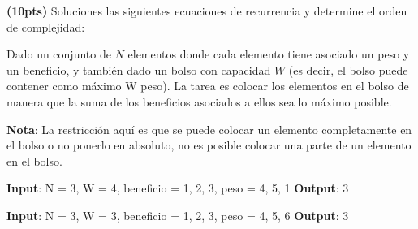 \documentclass[12pt, a4paper]{exam}
\begin{document}
\begin{questions}
	\pointsdroppedatright
         \question \textbf{(10pts)} Soluciones las siguientes ecuaciones de recurrencia y 
         determine el orden de complejidad:
	\question 

    Dado un conjunto de $N$ elementos donde cada elemento tiene asociado un peso y un 
    beneficio, y también dado un bolso con capacidad $W$ (es decir, el bolso puede contener 
    como máximo W peso). La tarea es colocar los elementos en el bolso de manera que la 
    suma de los beneficios asociados a ellos sea lo máximo posible.

    \textbf{Nota}: La restricción aquí es que se puede colocar un elemento completamente en el bolso
    o no ponerlo en absoluto, no es posible colocar una parte de un elemento en el bolso.

    \textbf{Input}: N = 3, W = 4, beneficio = {1, 2, 3}, peso = {4, 5, 1}
    \textbf{Output}: 3

    \textbf{Input}: N = 3, W = 3, beneficio = {1, 2, 3}, peso = {4, 5, 6}
    \textbf{Output}: 3

\end{questions}
\end{document}
